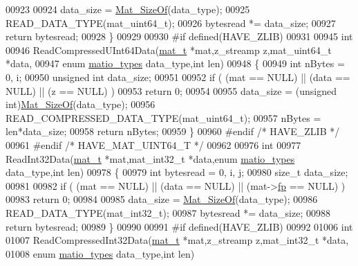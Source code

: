 \begin{DoxyCode}
00923 
00924     data\_size = \hyperlink{group__mat__util_gab6774aabdc124c540c1e7686d0804940}{Mat\_SizeOf}(data\_type);
00925     READ\_DATA\_TYPE(mat\_uint64\_t);
00926     bytesread *= data\_size;
00927     \textcolor{keywordflow}{return} bytesread;
00928 \}
00929 
00930 \textcolor{preprocessor}{#if defined(HAVE\_ZLIB)}
00931 
00945 \textcolor{keywordtype}{int}
00946 ReadCompressedUInt64Data(\hyperlink{struct__mat__t}{mat\_t} *mat,z\_streamp z,mat\_uint64\_t *data,
00947     \textcolor{keyword}{enum} \hyperlink{group___m_a_t_gacf7b3b879282b7ab3a51190e49bf3453}{matio\_types} data\_type,\textcolor{keywordtype}{int} len)
00948 \{
00949     \textcolor{keywordtype}{int} nBytes = 0, i;
00950     \textcolor{keywordtype}{unsigned} \textcolor{keywordtype}{int} data\_size;
00951 
00952     \textcolor{keywordflow}{if} ( (mat == NULL) || (data == NULL) || (z == NULL) )
00953         \textcolor{keywordflow}{return} 0;
00954 
00955     data\_size = (\textcolor{keywordtype}{unsigned} int)\hyperlink{group__mat__util_gab6774aabdc124c540c1e7686d0804940}{Mat\_SizeOf}(data\_type);
00956     READ\_COMPRESSED\_DATA\_TYPE(mat\_uint64\_t);
00957     nBytes = len*data\_size;
00958     \textcolor{keywordflow}{return} nBytes;
00959 \}
00960 \textcolor{preprocessor}{#endif }\textcolor{comment}{/* HAVE\_ZLIB */}\textcolor{preprocessor}{}
00961 \textcolor{preprocessor}{#endif }\textcolor{comment}{/* HAVE\_MAT\_UINT64\_T */}\textcolor{preprocessor}{}
00962 
00976 \textcolor{keywordtype}{int}
00977 ReadInt32Data(\hyperlink{struct__mat__t}{mat\_t} *mat,mat\_int32\_t *data,\textcolor{keyword}{enum} \hyperlink{group___m_a_t_gacf7b3b879282b7ab3a51190e49bf3453}{matio\_types} data\_type,\textcolor{keywordtype}{int} len)
00978 \{
00979     \textcolor{keywordtype}{int} bytesread = 0, i, j;
00980     \textcolor{keywordtype}{size\_t} data\_size;
00981 
00982     \textcolor{keywordflow}{if} ( (mat == NULL) || (data == NULL) || (mat->\hyperlink{struct__mat__t_a85f562e407ca9ad4d2a6e14f839432b7}{fp} == NULL) )
00983         \textcolor{keywordflow}{return} 0;
00984 
00985     data\_size = \hyperlink{group__mat__util_gab6774aabdc124c540c1e7686d0804940}{Mat\_SizeOf}(data\_type);
00986     READ\_DATA\_TYPE(mat\_int32\_t);
00987     bytesread *= data\_size;
00988     \textcolor{keywordflow}{return} bytesread;
00989 \}
00990 
00991 \textcolor{preprocessor}{#if defined(HAVE\_ZLIB)}
00992 
01006 \textcolor{keywordtype}{int}
01007 ReadCompressedInt32Data(\hyperlink{struct__mat__t}{mat\_t} *mat,z\_streamp z,mat\_int32\_t *data,
01008     \textcolor{keyword}{enum} \hyperlink{group___m_a_t_gacf7b3b879282b7ab3a51190e49bf3453}{matio\_types} data\_type,\textcolor{keywordtype}{int} len)

\end{DoxyCode}
